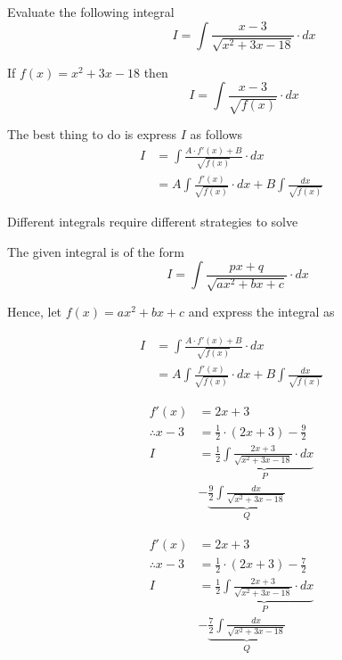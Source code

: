 \documentclass[14pt,fleqn]{extarticle}
\begin{document}
\newcommand\ea{x^2 + 3x-18} 
\newcommand\dnm{\sqrt{\ea}}

\newcommand\trma{\left(x+\frac{3}{2} \right)}
\newcommand\trmk{ \left(\frac{9}{2} \right)}

Evaluate the following integral 
\[ \qquad I = \int \frac{x-3}{\dnm}\cdot dx \]

\newcard 

If $f(x) = \ea$ then 
\[ \qquad I = \int \frac{x-3}{\sqrt{f(x)}}\cdot dx \]

The best thing to do is express $I$ as follows 
\begin{align}
	I &= \int \frac{A\cdot f'(x) + B}{\sqrt{f(x)}}\cdot dx \\
	&= A \int \frac{f'(x)}{\sqrt{f(x)}}\cdot dx + B\int \frac{dx}{\sqrt{f(x)}}
\end{align}

\newcard 

Different integrals require different strategies to solve \newline 

The given integral is of the form 
\[ \quad I = \int \frac{px+q}{\sqrt{ax^2 + bx + c}}\cdot dx \]

Hence, let $f(x) = ax^2+bx+c$ and express the integral as 

\begin{align}
	I &= \int \frac{A\cdot f'(x) + B}{\sqrt{f(x)}}\cdot dx \\
	&= A \int \frac{f'(x)}{\sqrt{f(x)}}\cdot dx + B \int \frac{dx}{\sqrt{f(x)}}
\end{align}

\newcard 

\begin{align}
f'(x) &= 2x + 3 \\
\therefore x-3 &= \frac{1}{2}\cdot \left(2x+3 \right) - \frac{9}{2} \\
I &= \underbrace{\frac{1}{2}\int \frac{2x+3}{\dnm}\cdot dx}_P \\
&- \underbrace{\frac{9}{2}\int \frac{dx}{\dnm}}_Q 
\end{align}

\newcard 

\begin{align}
f'(x) &= 2x + 3 \\
\therefore x-3 &= \frac{1}{2}\cdot \left(2x+3 \right) - \frac{7}{2} \\
I &= \underbrace{\frac{1}{2}\int \frac{2x+3}{\dnm}\cdot dx}_P \\
&- \underbrace{\frac{7}{2}\int \frac{dx}{\dnm}}_Q 
\end{align}
\end{document}
